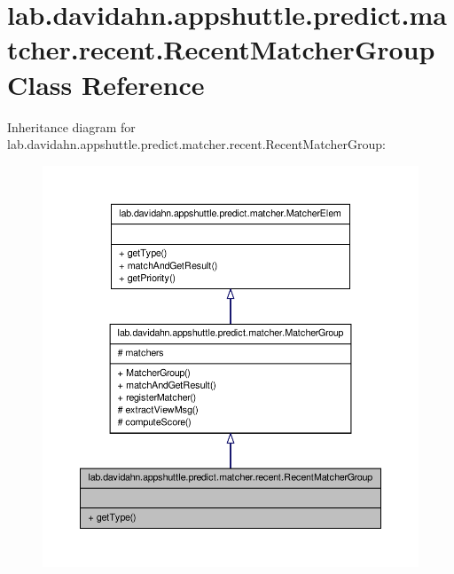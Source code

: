 \hypertarget{classlab_1_1davidahn_1_1appshuttle_1_1predict_1_1matcher_1_1recent_1_1_recent_matcher_group}{\section{lab.\-davidahn.\-appshuttle.\-predict.\-matcher.\-recent.\-Recent\-Matcher\-Group \-Class \-Reference}
\label{classlab_1_1davidahn_1_1appshuttle_1_1predict_1_1matcher_1_1recent_1_1_recent_matcher_group}
}


\-Inheritance diagram for lab.\-davidahn.\-appshuttle.\-predict.\-matcher.\-recent.\-Recent\-Matcher\-Group\-:
\nopagebreak
\begin{figure}[H]
\begin{center}
\leavevmode
\includegraphics[width=350pt]{classlab_1_1davidahn_1_1appshuttle_1_1predict_1_1matcher_1_1recent_1_1_recent_matcher_group__inherit__graph}
\end{center}
\end{figure}


